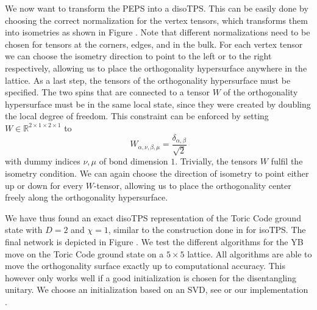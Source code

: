 We now want to transform the PEPS into a disoTPS. This can be easily done by choosing the correct normalization for the vertex tensors, which transforms them into isometries as shown in Figure . Note that different normalizations need to be chosen for tensors at the corners, edges, and in the bulk. For each vertex tensor we can choose the isometry direction to point to the left or to the right respectively, allowing us to place the orthogonality hypersurface anywhere in the lattice. As a last step, the tensors of the orthogonality hypersurface must be specified. The two spins that are connected to a tensor $W$ of the orthogonality hypersurface must be in the same local state, since they were created by doubling the local degree of freedom. This constraint can be enforced by setting $W\in\mathbb{R}^{2\times1\times2\times1}$ to
\begin{equation}
	W_{\alpha,\nu,\beta,\mu} = \frac{\delta_{\alpha,\beta}}{\sqrt{2}}
\end{equation} 
with dummy indices $\nu, \mu$ of bond dimension $1$. Trivially, the tensors $W$ fulfil the isometry condition. We can again choose the direction of isometry to point either up or down for every $W$-tensor, allowing us to place the orthogonality center freely along the orthogonality hypersurface.\par
We have thus found an exact disoTPS representation of the Toric Code ground state with $D = 2$ and $\chi= 1$, similar to the construction done in \cite{cite:isometric_tensor_network_representation_of_string_net_liquids} for isoTPS. The final network is depicted in Figure . We test the different algorithms for the YB move on the Toric Code ground state on a $5\times5$ lattice. All algorithms are able to move the orthogonality surface exactly up to computational accuracy. This however only works well if a good initialization is chosen for the disentangling unitary. We choose an initialization based on an SVD, see \cite{cite:isometric_tensor_network_states_in_two_dimensions, cite:efficient_simulation_of_dynamics_in_two_dimensional_quantum_spin_systems} or our implementation \cite{cite:github_disoTPS}.